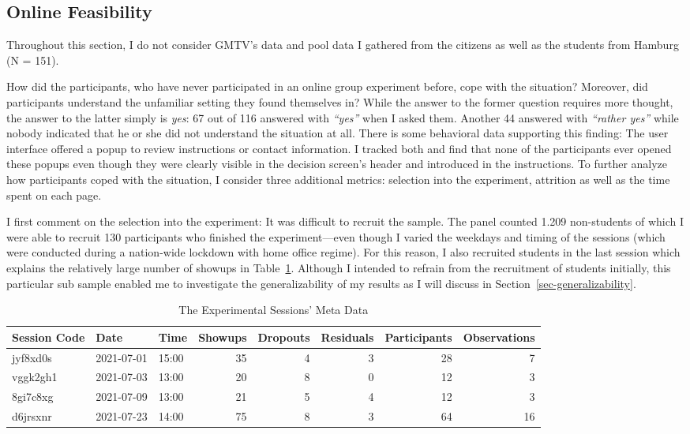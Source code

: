 \documentclass[
  authoryear,
  preprint,
  3p]{elsarticle}
\begin{document}
\hypertarget{sec-feasibility}{%
\subsection{Online Feasibility}\label{sec-feasibility}}

Throughout this section, I do not consider GMTV's data and pool data I
gathered from the citizens as well as the students from Hamburg (N =
151).

How did the participants, who have never participated in an online group
experiment before, cope with the situation? Moreover, did participants
understand the unfamiliar setting they found themselves in? While the
answer to the former question requires more thought, the answer to the
latter simply is \emph{yes}: 67 out of 116 answered with \emph{``yes''}
when I asked them. Another 44 answered with \emph{``rather yes''} while
nobody indicated that he or she did not understand the situation at all.
There is some behavioral data supporting this finding: The user
interface offered a popup to review instructions or contact information.
I tracked both and find that none of the participants ever opened these
popups even though they were clearly visible in the decision screen's
header and introduced in the instructions. To further analyze how
participants coped with the situation, I consider three additional
metrics: selection into the experiment, attrition as well as the time
spent on each page.

I first comment on the selection into the experiment: It was difficult
to recruit the sample. The panel counted 1.209 non-students of which I
were able to recruit 130 participants who finished the experiment---even
though I varied the weekdays and timing of the sessions (which were
conducted during a nation-wide lockdown with home office regime). For
this reason, I also recruited students in the last session which
explains the relatively large number of showups in Table~\ref{tbl-meta}.
Although I intended to refrain from the recruitment of students
initially, this particular sub sample enabled me to investigate the
generalizability of my results as I will discuss in
Section~\ref{sec-generalizability}.

\hypertarget{tbl-meta}{}
\begin{table}
\caption{\label{tbl-meta}The Experimental Sessions' Meta Data }\tabularnewline

\centering
\begin{tabular}{l|l|l|r|r|r|r|r}
\hline
Session Code & Date & Time & Showups & Dropouts & Residuals & Participants & Observations\\
\hline
jyf8xd0s & 2021-07-01 & 15:00 & 35 & 4 & 3 & 28 & 7\\
\hline
vggk2gh1 & 2021-07-03 & 13:00 & 20 & 8 & 0 & 12 & 3\\
\hline
8gi7c8xg & 2021-07-09 & 13:00 & 21 & 5 & 4 & 12 & 3\\
\hline
d6jrsxnr & 2021-07-23 & 14:00 & 75 & 8 & 3 & 64 & 16\\
\hline
\end{tabular}
\end{table}
\end{document}
